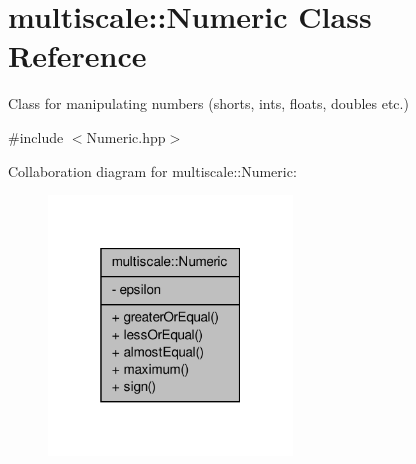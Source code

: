 \hypertarget{classmultiscale_1_1Numeric}{\section{multiscale\-:\-:Numeric Class Reference}
\label{classmultiscale_1_1Numeric}
}


Class for manipulating numbers (shorts, ints, floats, doubles etc.)  




{\ttfamily \#include $<$Numeric.\-hpp$>$}



Collaboration diagram for multiscale\-:\-:Numeric\-:\nopagebreak
\begin{figure}[H]
\begin{center}
\leavevmode
\includegraphics[width=184pt]{classmultiscale_1_1Numeric__coll__graph}
\end{center}
\end{figure}
